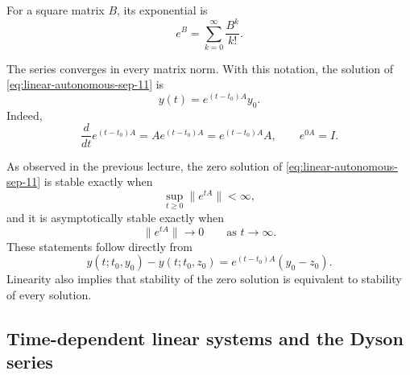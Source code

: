 \begin{definition}
  For a square matrix \(B\), its exponential is
  \begin{equation}\label{eq:matrix-exponential-definition-sep-11}
    e^B=\sum_{k=0}^{\infty}\frac{B^k}{k!}.
  \end{equation}
\end{definition}

The series converges in every matrix norm. With this notation, the
solution of \eqref{eq:linear-autonomous-sep-11} is
\begin{equation}\label{eq:linear-solution-sep-11}
  y(t)=e^{(t-t_0)A}y_0.
\end{equation}
Indeed,
\[
  \frac{d}{dt}e^{(t-t_0)A}
  =Ae^{(t-t_0)A}=e^{(t-t_0)A}A,
  \qquad
  e^{0A}=I.
\]

As observed in the previous lecture, the zero solution of
\eqref{eq:linear-autonomous-sep-11} is stable exactly when
\begin{equation}\label{eq:bounded-semigroup-sep-11}
  \sup_{t\geq0}\lVert e^{tA}\rVert<\infty,
\end{equation}
and it is asymptotically stable exactly when
\begin{equation}\label{eq:decaying-semigroup-sep-11}
  \lVert e^{tA}\rVert\longrightarrow0
  \qquad\text{as }t\to\infty.
\end{equation}
These statements follow directly from
\[
  y(t;t_0,y_0)-y(t;t_0,z_0)
  =e^{(t-t_0)A}(y_0-z_0).
\]
Linearity also implies that stability of the zero solution is
equivalent to stability of every solution.

\subsection{Time-dependent linear systems and the Dyson series}

